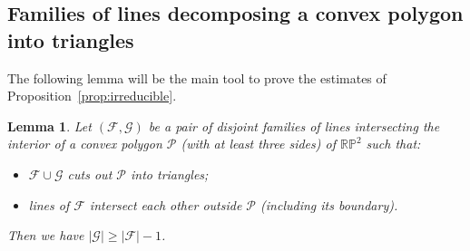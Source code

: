 \documentclass[a4paper,11pt,reqno]{amsart}
\newtheorem{lem}[thm]{Lemma}
\theoremstyle{definition}
\theoremstyle{remark}
\theoremstyle{definition}
\theoremstyle{definition}
\theoremstyle{definition}
\numberwithin{equation}{section}
\begin{document}
\subsection{Families of lines decomposing a convex polygon into triangles}

The following lemma will be the main tool to prove the estimates of Proposition~\ref{prop:irreducible}.

\begin{lem}\label{lem:CPInter}
Let $(\mathcal{F},\mathcal{G})$ be a pair of disjoint families of lines intersecting the interior of a convex polygon $\mathcal{P}$ (with at least three sides) of $\mathbb{RP}^{2}$ such that:
\begin{itemize}
    \item $\mathcal{F}\cup \mathcal{G}$ cuts out $\mathcal{P}$ into triangles;
    \item lines of $\mathcal{F}$ intersect each other outside $\mathcal{P}$ (including its boundary).
\end{itemize}
Then we have $|\mathcal{G}| \geq |\mathcal{F}|-1$.
\end{lem}
\end{document}
